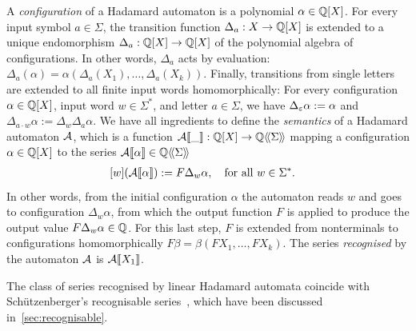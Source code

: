 A \emph{configuration} of a Hadamard automaton is a polynomial $\alpha \in \poly \Q X$.
%
For every input symbol $a \in \Sigma$,
the transition function $\Delta_a : X \to \poly \Q X$
is extended to a unique endomorphism $\Delta_a : \poly \Q X \to \poly \Q X$ of the polynomial algebra of configurations.
In other words, $\Delta_a$ acts by evaluation:
$\Delta_a(\alpha) = \alpha(\Delta_a(X_1), \dots, \Delta_a(X_k))$.
%
Finally, transitions from single letters
are extended to all finite input words homomorphically:
For every configuration $\alpha \in \poly \Q X$,
input word $w \in \Sigma^*$, and letter $a \in \Sigma$,
we have $\Delta_\e \alpha := \alpha$
and $\Delta_{a \cdot w} \alpha := \Delta_w \Delta_a \alpha$.
%
We have all ingredients to define the \emph{semantics} of a Hadamard automaton $\AA$,
which is a function $\Asem \AA \_ : \poly \Q X \to \series \Q \Sigma$
mapping a configuration $\alpha \in \poly \Q X$ to the series $\Asem \AA \alpha \in \series \Q \Sigma$ \st
%
\begin{align}
    \label{eq:semantics}
    \coefficient w {(\Asem \AA \alpha)} &:= F \Delta_w \alpha,
        \quad \text{for all } w \in \Sigma^*.
\end{align}
%
In other words, from the initial configuration $\alpha$ the automaton reads $w$ and goes to configuration $\Delta_w \alpha$,
from which the output function $F$ is applied to produce the output value $F \Delta_w \alpha \in \Q$.
% 
For this last step, $F$ is extended from nonterminals to configurations homomorphically
$F \beta = \beta(F X_1, \dots, F X_k)$. %
%
The series \emph{recognised} by the automaton $\AA$ is $\Asem \AA {X_1}$.

\begin{remark}
    The class of series recognised by linear Hadamard automata
    coincide with Schützenberger's recognisable series~\cite{Schutzenberger:IC:1961},
    which have been discussed in~\cref{sec:recognisable}.
\end{remark}

